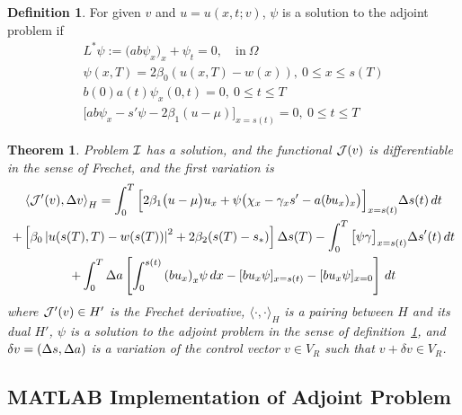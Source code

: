 \documentclass[letterpaper, 10pt]{amsart}
\newtheorem{theorem}{Theorem}
\theoremstyle{definition}
\newtheorem{definition}{Definition}
\theoremstyle{remark}
\newcommand{\lnorm}[1]{\left\vert #1\right\vert}%
\begin{document}
\begin{definition}\label{defn:adjoint}
  For given $v$ and $u = u(x, t; v)$, $\psi$ is a solution to the adjoint problem if
  \begin{gather}
    L^{*} \psi := \big(a b \psi_x\big)_x + \psi_t = 0,\quad\text{in}~\Omega \label{eq:adj-pde}
    \\
    \psi(x, T) = 2\beta_0(u(x, T) - w(x)),~0 \leq x \leq s(T) \label{eq:adj-finalmoment}
    \\
    b(0)a(t)\psi_x(0, t) =0,~0 \leq t \leq T \label{eq:adj-robin-fixed}
    \\
    \Big[a b \psi_x - s'\psi - 2\beta_1(u - \mu)\Big]_{x=s(t)}=0, ~0 \leq t \leq T \label{eq:adj-robin-free}
  \end{gather}
\end{definition}


\begin{theorem}\label{thm:gradient-result}
  Problem $\mathcal{I}$ has a solution, and the functional $\mathcal{J}(v)$ is differentiable in the sense of Frechet, and the first variation is
  \begin{gather}
    \left\langle \J'(v),\Delta v \right\rangle_H
    = \int_0^T \Big[2\beta_1\big(u - \mu\big)u_x + \psi \big(\chi_x - \gamma_x s'  - a (b u_x)_x \big)\Big]_{x=s(t)} {\Delta s}(t)\,dt \nonumber
    \\
    +
    \left[\beta_0\lnorm{u(s(T),T) - w(s(T))}^2 + 2 \beta_2 (s(T) - s_*)\right] {\Delta s}(T) 
    - \int_0^T \big[\psi \gamma\big]_{x=s(t)} {\Delta s}'(t) \,dt \nonumber
    \\
    +\int_0^T {\Delta a} \left[ \int_0^{s(t)} {(b u_x)}_x \psi \,dx - [b u_x\psi]_{x=s(t)} - [b u_x \psi]_{x=0}\right] \,dt\label{eq:gradient-full}
  \end{gather}
  where $\mathcal{J}'(v) \in H'$ is the Frechet derivative, $\langle \cdot,\cdot \rangle_H$ is a pairing between $H$ and its dual $H'$, $\psi$ is a solution to the adjoint problem in the sense of definition~\ref{defn:adjoint}, and $\delta v = ({\Delta s}, {\Delta a}{})$ is a variation of the control vector $v \in V_R$ such that $v + \delta v \in V_R$.
\end{theorem}

\subsection{MATLAB Implementation of Adjoint Problem}
\end{document}
